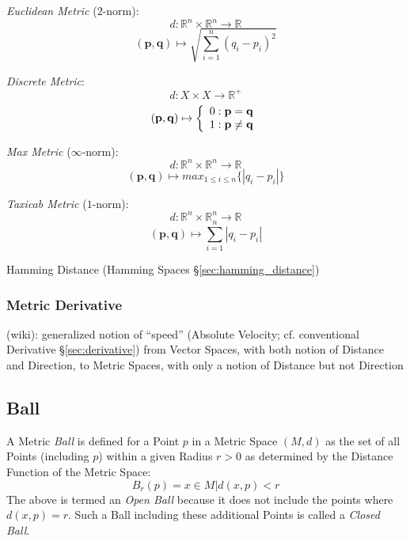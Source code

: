 \emph{Euclidean Metric} ($2$-norm):
\[
  d: \mathbb{R}^n \times \mathbb{R}^n \rightarrow \mathbb{R}
\]\[
  (\mathbf{p},\mathbf{q}) \mapsto \sqrt{\sum_{i=1}^{n}(q_i - p_i)^2}
\]

\emph{Discrete Metric}:
\[
  d: X \times X \rightarrow \mathbb{R}^{+}
\]\[
  (\mathbf{p},\mathbf{q}) \mapsto \left\{
  \begin{array}{l l}
    0: \mathbf{p} = \mathbf{q}\\
    1: \mathbf{p} \neq \mathbf{q}
  \end{array}\right.
\]

\emph{Max Metric} ($\infty$-norm):
\[
  d: \mathbb{R}^n \times \mathbb{R}^n \rightarrow \mathbb{R}
\]\[
  (\mathbf{p},\mathbf{q}) \mapsto max_{1 \leq i \leq n}\{|q_i - p_i|\}
\]

\emph{Taxicab Metric} ($1$-norm):
\[
  d: \mathbb{R}^n \times \mathbb{R}^n \rightarrow \mathbb{R}
\]\[
  (\mathbf{p},\mathbf{q}) \mapsto \sum_{i=1}^{n}|q_i - p_i|
\]

\fist Hamming Distance (Hamming Spaces \S\ref{sec:hamming_distance})



\subsubsection{Metric Derivative}\label{sec:metric_derivative}

(wiki): generalized notion of ``speed'' (Absolute Velocity; cf. conventional
Derivative \S\ref{sec:derivative}) from Vector Spaces, with both notion of
Distance and Direction, to Metric Spaces, with only a notion of Distance but not
Direction



\subsection{Ball}\label{sec:ball}

A Metric \emph{Ball} is defined for a Point $p$ in a Metric Space
$(M,d)$ as the set of all Points (including $p$) within a given Radius
$r > 0$ as determined by the Distance Function of the Metric Space:
\[
  B_r(p) = {x \in M | d(x,p) < r }
\]
The above is termed an \emph{Open Ball} because it does not include
the points where $d(x,p) = r$. Such a Ball including these additional
Points is called a \emph{Closed Ball}.

